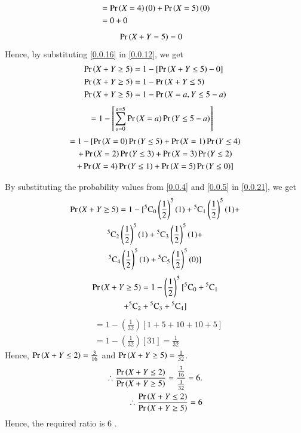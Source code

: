 \documentclass[journal,12pt,twocolumn]{IEEEtran}
\newcommand{\comb}[2]{{}^{#1}\mathrm{C}_{#2}}
\begin{document}
\begin{align}
&= \Pr\left(X = 4\right)(0) + \Pr\left(X = 5\right)(0) \\
&= 0 + 0 
\end{align}
\begin{align}
\Pr\left(X + Y = 5\right) &= 0 \label{0.0.16}    
\end{align}
Hence, by substituting \eqref{0.0.16} in \eqref{0.0.12}, we get
\begin{align}
\Pr\left(X + Y \geq 5\right) &= 1 - [\Pr\left(X + Y \leq 5\right) -  0] \\
\Pr\left(X + Y \geq 5\right) &= 1 - \Pr\left(X + Y \leq 5\right) \\
\Pr\left(X + Y \geq 5\right) &= 1 - \Pr\left(X = a, Y \leq 5 - a\right)
\end{align}
\begin{align}
&= 1 - \left[\sum_{a = 0}^{a = 5} \Pr\left(X = a\right)\Pr\left(Y \leq 5-a\right) \right]     
\end{align}
\begin{multline}
= 1 - [ \Pr\left(X = 0\right)\Pr\left(Y \leq 5\right) + \Pr\left(X = 1\right)\Pr\left(Y \leq 4\right) \\
+ \Pr\left(X = 2\right)\Pr\left(Y \leq 3\right) + \Pr\left(X = 3\right)\Pr\left(Y \leq 2\right) \\
+ \Pr\left(X = 4\right)\Pr\left(Y \leq 1\right) + \Pr\left(X = 5\right)\Pr\left(Y \leq 0\right) ] \label{0.0.21}    
\end{multline}


By substituting the probability values from \eqref{0.0.4} and \eqref{0.0.5} in \eqref{0.0.21}, we get
\begin{multline}
\pr{X + Y \geq 5} = 1 - [\comb{5}{0}\left(\frac{1}{2}\right)^{5}(1) + \comb{5}{1}\left(\frac{1}{2}\right)^{5}(1) + \\ \comb{5}{2}\left(\frac{1}{2}\right)^{5}(1) + 
\comb{5}{3}\left(\frac{1}{2}\right)^{5}(1) + \\
\comb{5}{4}\left(\frac{1}{2}\right)^{5}(1) + 
\comb{5}{5}\left(\frac{1}{2}\right)^{5}(0)]  
\end{multline}
\begin{multline}
\pr{X + Y \geq 5} = 1 - \left(\frac{1}{2}\right)^{5} [\comb{5}{0} + \comb{5}{1} \\ + \comb{5}{2} + \comb{5}{3} + \comb{5}{4}]    
\end{multline}
\begin{align}
&= 1 - \left(\frac{1}{32}\right)\left[1 + 5 + 10 + 10 + 5 \right] \\
&= 1- \left(\frac{1}{32}\right)\left[31 \right] = \frac{1}{32}
\end{align}
Hence,
$\Pr\left(X + Y \leq 2\right) = \frac{3}{16}$ and $\Pr\left(X + Y \geq 5\right) = \frac{1}{32}$.
\begin{align*}
\therefore \frac{\Pr\left(X + Y \leq 2\right)}{\Pr\left(X + Y \geq 5\right)} = \frac{\frac{3}{16}}{\frac{1}{32}} = 6. \\
\therefore \frac{\Pr\left(X + Y \leq 2\right)}{\Pr\left(X + Y \geq 5\right)} = 6    
\end{align*}
Hence, the required ratio is 6 .
\end{document}
